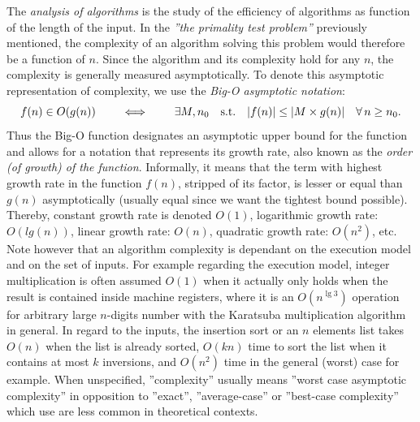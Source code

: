 	The \emph{analysis of algorithms} is %
		the study of the efficiency of algorithms as function of the length of the input.
	In the \textit{''the primality test \emph{problem}''} previously mentioned, the complexity of an algorithm solving this problem would therefore be a function of $n$. %
	Since the algorithm and its complexity hold for any %
		$n$, the complexity is generally measured asymptotically.
	To denote this asymptotic representation of complexity, we use the \emph{Big-O asymptotic notation}:
	\[ f(n) \in O(g(n)) \qquad \iff \qquad \exists M,n_0 \quad \text{s.t.}\quad \lvert f(n)\rvert \leq \lvert M\times{}g(n)\rvert \quad \forall\, n\geq n_0.\]
	Thus the Big-O function designates an asymptotic upper bound for the function and allows for a notation that represents its growth rate, also known as the \emph{order (of growth) of the function}.
	Informally, it means that the term with highest growth rate in the function $f(n)$, stripped of its factor, is lesser or equal than $g(n)$ asymptotically (usually equal since we want the tightest bound possible).
	Thereby, constant growth rate is denoted $O\left(1\right)$, logarithmic growth rate: $O\left(lg\left(n\right)\right)$, linear growth rate: $O\left(n\right)$, quadratic growth rate: $O\left(n^2\right)$, etc.
	Note however that an algorithm complexity is dependant on the execution model and on the set of inputs.
	For example regarding the execution model, integer multiplication is often assumed $O\left(1\right)$ when it actually only holds when the result is contained inside machine registers, where it is an $O\left(n^{\lg 3}\right)$ operation for arbitrary large $n$-digits number with the Karatsuba multiplication algorithm \parencite{karatsuba1963multiplication} in general.
	In regard to the inputs, the insertion sort or an $n$ elements list takes $O(n)$ when the list is already sorted, $O(kn)$ time to sort the list when it contains at most $k$ inversions, and $O(n^2)$ time in the general (worst) case for example.
	When unspecified, ''complexity'' usually means ''worst case asymptotic complexity'' in opposition to ''exact'', ''average-case'' or ''best-case complexity'' which use are less common in theoretical contexts.

